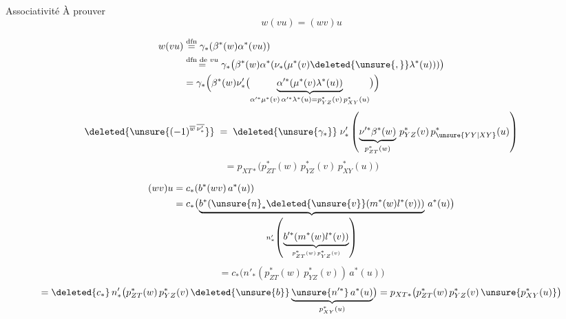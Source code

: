 Associativité
À prouver
\[
w(vu)=(wv)u
\]

\[
\begin{aligned}
w(vu)&\overset{\text{dfn}}=\gamma_*(\beta^*(w)\alpha^*(vu))\\
&\overset{\text{dfn de }vu}=\gamma_*\bigl(\beta^*(w)\alpha^*(\nu_*(\mu^*(v)\deleted{\unsure{,}}\lambda^*(u)))\bigr)\\
&=\gamma_*\Bigl(\beta^*(w)\nu'_*\bigl(\underbrace{\alpha'^*(\mu^*(v)\lambda^*(u))}_{\alpha'^*\mu^*(v)\,\alpha'^*\lambda^*(u)=p_{YZ}^*(v)\,p_{XY}^*(u)}\bigr)\Bigr)
\end{aligned}
\]
\[
\deleted{\unsure{(-1)^{\overline w\,\overline{\nu'_*}}}}\;=\;\deleted{\unsure{\gamma_*}}\;
\nu'_*\left(\underbrace{\nu'^*\beta^*(w)}_{p_{ZT}^*(w)}\,p_{YZ}^*(v)\,p_{\unsure{YY|XY}}^*(u)\right)
\]
\[
=p_{XT*}\bigl(p_{ZT}^*(w)\,p_{YZ}^*(v)\,p_{XY}^*(u)\bigr)
\]

\[
\begin{aligned}
(wv)u&=c_*(b^*(wv)\,a^*(u))\\
&=c_*\bigl(\underbrace{b^*(\unsure{n}_*\deleted{\unsure{v}}(m^*(w)l^*(v)))}_{n'_*\left(\underbrace{b'^*(m^*(w)l^*(v))}_{p_{ZT}^*(w)\,p_{YZ}^*(v)}\right)}\,a^*(u)\bigr)
\end{aligned}
\]
\[
=c_*\bigl(n'_*(p_{ZT}^*(w)\,p_{YZ}^*(v))\,a^*(u)\bigr)
\]
\[
=\deleted{c_*}\,n'_*\bigl(p_{ZT}^*(w)\,p_{YZ}^*(v)\,
\deleted{\unsure{b}}\underbrace{\unsure{n'^*}\,a^*(u)}_{p_{XY}^*(u)}\bigr)
=p_{XT*}\bigl(p_{ZT}^*(w)\,p_{YZ}^*(v)\,\unsure{p_{XY}^*(u)}\bigr)
\]
